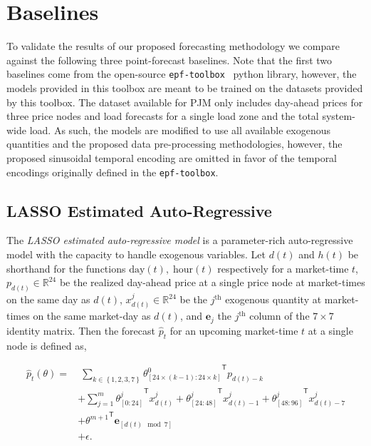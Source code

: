 \section{Baselines}\label{sec:baselines}

To validate the results of our proposed forecasting methodology we compare against the following three point-forecast
baselines.
Note that the first two baselines come from the open-source \texttt{epf-toolbox}~\cite{epftoolbox} python library,
however, the models provided in this toolbox are meant to be trained on the datasets provided by this toolbox.
The dataset available for PJM only includes day-ahead prices for three price nodes and load forecasts for a single
load zone and the total system-wide load.
As such, the models are modified to use all available exogenous quantities and the
proposed data pre-processing methodologies, however, the proposed sinusoidal temporal encoding are omitted in favor of
the temporal encodings originally defined in the \texttt{epf-toolbox}.

\subsection{LASSO Estimated Auto-Regressive}\label{subsec:lasso-estimated-auto-regressive}

The \textit{LASSO estimated auto-regressive model} is a parameter-rich auto-regressive model with the capacity to handle
exogenous variables.
Let $d(t)$ and $h(t)$ be shorthand for the functions $\text{day}(t),\; \text{hour}(t)$ respectively for a market-time
$t$, $p_{d(t)} \in \mathbb{R}^{24}$ be the realized day-ahead price at a single price node at market-times on the same
day as $d(t)$, $x^j_{d(t)} \in \mathbb{R}^{24}$ be the $j^{\text{th}}$ exogenous quantity at market-times on the same market-day
as $d(t)$, and $\textbf{e}_{j}$ the $j^{\text{th}}$ column of the $7\times7$ identity matrix.
Then the forecast $\hat{p}_t$ for an upcoming market-time $t$ at a single node is defined as,

\begin{align*}
    \hat{p}_t(\theta) = & \; \sum_{k \in \left\{ 1, 2, 3, 7 \right\}} {\theta^0_{\left[ 24 \times (k-1) : 24 \times k \right]}}^\mathsf{T} p_{d(t) - k} \\
                        & +  \sum_{j=1}^m {\theta^j_{\left[0:24\right]}}^\mathsf{T} x^j_{d(t)} + {\theta^j_{\left[24:48\right]}}^\mathsf{T} x^j_{d(t) - 1} + {\theta^j_{\left[48:96\right]}}^\mathsf{T} x^j_{d(t) - 7} \\
                        & +  {\theta^{m + 1}}^\mathsf{T} \textbf{e}_{\left[d(t) \mod 7\right]} \\
                        & +  \epsilon.
\end{align*}


